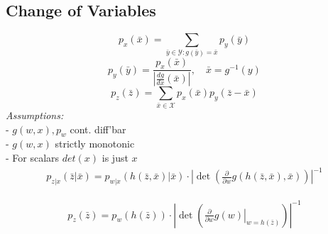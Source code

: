 \subsection{Change of Variables}
    \begin{equation*}
        \textstyle p_x(\bar{x}) = \sum_{\bar{y}\in\mathcal{Y}:g(\bar{y})=\bar{x}} p_y(\bar{y})
    \end{equation*}
    \begin{equation*}
        p_y(\bar{y}) = \frac{p_x(\bar{x})}{\left\lvert \frac{dg}{dx}(\bar{x}) \right\rvert}, \quad \bar{x} = g^{-1}(y)
    \end{equation*}
    \begin{equation*}
        p_z(\bar{z}) = \sum_{\bar{x}\in\mathcal{X}} p_x(\bar{x}) p_y(\bar{z}-\bar{x})
    \end{equation*}
    \textit{Assumptions:} \\
    - $g(w,x), p_w$ cont. diff'bar \\
    - $g(w,x)$ strictly monotonic \\
    - For scalars $det(x)$ is just $x$
    \begin{align*}
        p_{z|x}(\bar{z}|\bar{x}) = 
        p_{w|x}(h(\bar{z},\bar{x})|\bar{x}) \cdot
        \left\lvert 
        \det\left( 
            \textstyle\frac{\partial}{\partial w}g(h(\bar{z},\bar{x}),\bar{x}) 
        \right) 
        \right\rvert^{-1}
    \end{align*}


    \begin{align*}
        p_{z}(\bar{z}) = 
        p_w(h(\bar{z})) \cdot
        \left\lvert 
        \det\left( 
            \textstyle \left. \frac{\partial}{\partial w}g(w)\right|_{w=h(\bar{z})} 
        \right) 
        \right\rvert^{-1}
    \end{align*}

